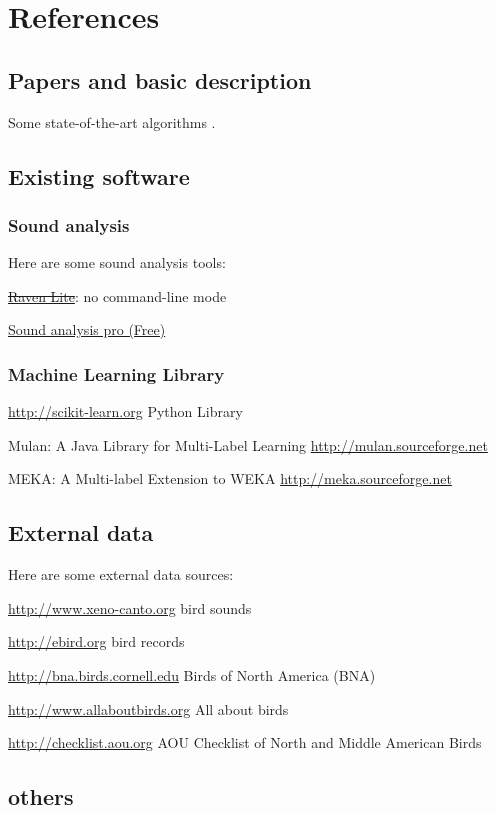 \section{References}

\subsection{Papers and basic description}

Some state-of-the-art algorithms \cite{briggs2013instance,Lasseck13,Massaron13,stattnersong13}.

\subsection{Existing software}

\subsubsection{Sound analysis}

Here are some sound analysis tools:

\href{http://www.birds.cornell.edu/brp/raven/ravenoverview.html}{\sout{Raven Lite}}: no command-line mode

\href{http://ofer.sci.ccny.cuny.edu/sound_analysis_pro} {Sound analysis pro (Free)}



\subsubsection{Machine Learning Library}

\url{http://scikit-learn.org} Python Library

Mulan: A Java Library for Multi-Label Learning \url{http://mulan.sourceforge.net}

MEKA: A Multi-label Extension to WEKA \url{http://meka.sourceforge.net}

\subsection{External data}

Here are some external data sources:

\url{http://www.xeno-canto.org} bird sounds

\url{http://ebird.org}  bird records

\url{http://bna.birds.cornell.edu} Birds of North America (BNA) 

\url{http://www.allaboutbirds.org} All about birds

\url{http://checklist.aou.org}       AOU Checklist of North and Middle American Birds


\subsection{others}


